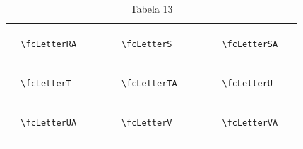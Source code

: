 \documentclass[x11names]{article}
\begin{document}
\begin{table}[H]
\begin{tabular}{|c|c|c|c|c|c|}
		&\multirow{5}{*}{	\fcLetterRA	[scale=0.16]} & &\multirow{5}{*}{	\fcLetterS	[scale=0.16]} & &\multirow{5}{*}{	\fcLetterSA	[scale=0.16]}\\	& & & & & \\	& & & & & \\	\verb|	\fcLetterRA	| & & \verb|	\fcLetterS	| & & \verb|	\fcLetterSA	| & \\	& & & & & \\	& & & & & \\	& & & & & \\	\hline									
		&\multirow{5}{*}{	\fcLetterT	[scale=0.16]} & &\multirow{5}{*}{	\fcLetterTA	[scale=0.16]} & &\multirow{5}{*}{	\fcLetterU	[scale=0.16]}\\	& & & & & \\	& & & & & \\	\verb|	\fcLetterT	| & & \verb|	\fcLetterTA	| & & \verb|	\fcLetterU	| & \\	& & & & & \\	& & & & & \\	& & & & & \\	\hline									
		&\multirow{5}{*}{	\fcLetterUA	[scale=0.16]} & &\multirow{5}{*}{	\fcLetterV	[scale=0.16]} & &\multirow{5}{*}{	\fcLetterVA	[scale=0.16]}\\	& & & & & \\	& & & & & \\	\verb|	\fcLetterUA	| & & \verb|	\fcLetterV	| & & \verb|	\fcLetterVA	| & \\	& & & & & \\	& & & & & \\	& & & & & \\		\hline 	\hline 	\end{tabular}	\caption{	Tabela 13	}\label{	Tab13	}\end{table}
\end{document}
